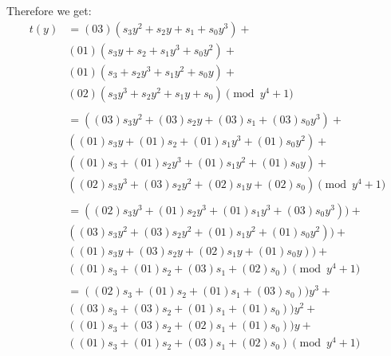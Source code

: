 \documentclass[11pt]{article}
\theoremstyle{definition}
\begin{document}
\begin{enumerate}[a. ]
\begin{enumerate}[i. ]
        Therefore we get:
        \begin{align*}
          t(y) &= (03)(s_3y^2 + s_2y   + s_1    + s_0y^3) + \\
               &  (01)(s_3y   + s_2    + s_1y^3 + s_0y^2) + \\
               &  (01)(s_3    + s_2y^3 + s_1y^2 + s_0y  ) + \\
               &  (02)(s_3y^3 + s_2y^2 + s_1y   + s_0   ) \pmod{y^4 + 1} \\
          \\
               &= ((03)s_3y^2 + (03)s_2y   + (03)s_1    + (03)s_0y^3) + \\
               &  ((01)s_3y   + (01)s_2    + (01)s_1y^3 + (01)s_0y^2) + \\
               &  ((01)s_3    + (01)s_2y^3 + (01)s_1y^2 + (01)s_0y  ) + \\
               &  ((02)s_3y^3 + (03)s_2y^2 + (02)s_1y   + (02)s_0   )  \pmod{y^4  +1} \\
          \\
               &= ((02)s_3y^3 + (01)s_2y^3 + (01)s_1y^3 + (03)s_0y^3)) + \\
               &  ((03)s_3y^2 + (03)s_2y^2 + (01)s_1y^2 + (01)s_0y^2)) + \\
               &  ((01)s_3y   + (03)s_2y   + (02)s_1y   + (01)s_0y)  ) + \\
               &  ((01)s_3    + (01)s_2    + (03)s_1    + (02)s_0    )  \pmod{y^4  +1} \\
          \\
               &= ((02)s_3 + (01)s_2 + (01)s_1 + (03)s_0))y^3 +          \\
               &  ((03)s_3 + (03)s_2 + (01)s_1 + (01)s_0))y^2 +          \\
               &  ((01)s_3 + (03)s_2 + (02)s_1 + (01)s_0))y +            \\
               &  ((01)s_3 + (01)s_2 + (03)s_1 + (02)s_0) \pmod{y^4 + 1} \\
        \end{align*}


\end{enumerate}
\end{enumerate}
\end{document}
